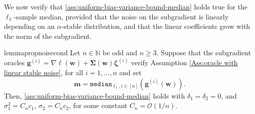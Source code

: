 \documentclass[10pt]{article} %
\renewcommand{\vec}[1]{\bm{#1}}
\newcommand{\bw}{\bm{w}}
\newcommand{\bg}{\bm{g}}
\newcommand{\samplemedian}[1]{\texttt{median}_{#1,i\in[n]}}
\begin{document}
We now verify that \cref{ass:uniform-bias-variance-bound-median} holds true for the $\ell_1$-sample median, provided that the noise on the subgradient is linearly depending on an $\alpha$-stable distribution, and that the linear coefficients grow with the norm of the subgradient.



\begin{restatable}{lemma}{propnoisecond}\label{stable noise implies finite bias variance v2}
Let $n \in \mathbb{N}$ be odd and $n \geq 3$. Suppose that the subgradient oracles $\bg^{(i)} = \nabla \ell(\vec{w}) + \vec{\Sigma}(\bw)\vec{\zeta}^{(i)}$ verify Assumption \ref{Ass:oracle with linear stable noise}, for all $i=1,\dots,n$ and set $$\vec{m} = \samplemedian{\ell_1}\left(\bg^{(i)}(\vec{w})\right).$$
% 
Then, \cref{ass:uniform-bias-variance-bound-median} holds with $\delta_1 = \delta_2 =0$, and  $\sigma_1^2 = C_n c_1$, $\sigma_2 = C_n c_2$, for some constant $C_n = \mathcal{O}(1/n)$.
\end{restatable}
\end{document}
